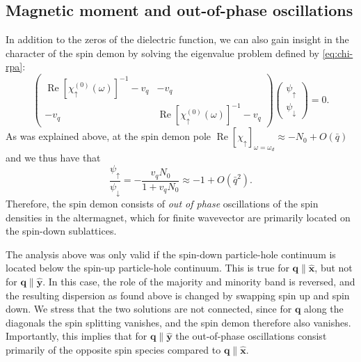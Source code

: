 \documentclass[aps,prb,reprint,twocolumns,superscriptaddress,nofootinbib]{revtex4-2}
\DeclareMathOperator{\Ree}{Re}
\newcommand{\xx}{\hat{\bm{x}}}
\newcommand{\yy}{\hat{\bm{y}}}
\begin{document}
	\subsection{Magnetic moment and out-of-phase oscillations}
	\label{sec:magnetic-moment}
	In addition to the zeros of the dielectric function, we can also gain insight in the character of the spin demon by solving the eigenvalue problem defined by \cref{eq:chi-rpa}:
	\begin{equation}
		\begin{pmatrix}
			\Ree[\chi_{\uparrow}^{(0)}(\omega)]^{-1}-v_q & -v_q \\
			-v_q & \Ree[\chi_{\uparrow}^{(0)}(\omega)]^{-1}-v_q
		\end{pmatrix}\begin{pmatrix}
			\psi_\uparrow \\ \psi_\downarrow
		\end{pmatrix} =0.
	\end{equation}
	As was explained above, at the spin demon pole $\Ree[\chi_\uparrow]_{\omega=\omega_d}\approx-N_0 + O(\bar q)$ and we thus have that 
	\begin{equation}
		\frac{\psi_\uparrow}{\psi_\downarrow} = -\frac{v_qN_0}{1 + v_qN_0}\approx -1 + O(\bar q^2).
	\end{equation}
	Therefore, the spin demon consists of \emph{out of phase} oscillations of the spin densities in the altermagnet, which for finite wavevector are primarily located on the spin-down sublattices.
	
	
	The analysis above was only valid if the spin-down particle-hole continuum is located below the spin-up particle-hole continuum. This is true for $\bm q\parallel \xx$, but not for $\bm q\parallel \yy$. In this case, the role of the majority and minority band is reversed, and the resulting dispersion as found above is changed by swapping spin up and spin down. We stress that the two solutions are not connected, since for $\bm q$ along the diagonals the spin splitting vanishes, and the spin demon therefore also vanishes.
	Importantly, this implies that for $\bm q \parallel \yy$ the out-of-phase oscillations consist primarily of the opposite spin species compared to $\bm q\parallel\xx$. 
	
\end{document}
